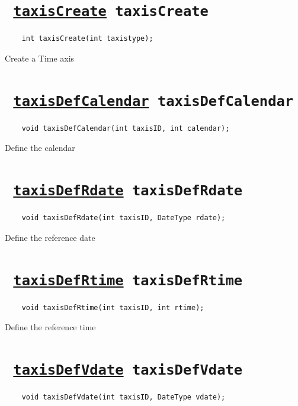 \section*{\texttt{ 
\ifpdf
\hyperref[taxisCreate]{taxisCreate}
\else
taxisCreate
\fi
}}
\begin{verbatim}
    int taxisCreate(int taxistype);
\end{verbatim}

Create a Time axis
\ifpdfoutput{}{(\ref{taxisCreate})}


\section*{\texttt{ 
\ifpdf
\hyperref[taxisDefCalendar]{taxisDefCalendar}
\else
taxisDefCalendar
\fi
}}
\begin{verbatim}
    void taxisDefCalendar(int taxisID, int calendar);
\end{verbatim}

Define the calendar
\ifpdfoutput{}{(\ref{taxisDefCalendar})}


\section*{\texttt{ 
\ifpdf
\hyperref[taxisDefRdate]{taxisDefRdate}
\else
taxisDefRdate
\fi
}}
\begin{verbatim}
    void taxisDefRdate(int taxisID, DateType rdate);
\end{verbatim}

Define the reference date
\ifpdfoutput{}{(\ref{taxisDefRdate})}


\section*{\texttt{ 
\ifpdf
\hyperref[taxisDefRtime]{taxisDefRtime}
\else
taxisDefRtime
\fi
}}
\begin{verbatim}
    void taxisDefRtime(int taxisID, int rtime);
\end{verbatim}

Define the reference time
\ifpdfoutput{}{(\ref{taxisDefRtime})}


\section*{\texttt{ 
\ifpdf
\hyperref[taxisDefVdate]{taxisDefVdate}
\else
taxisDefVdate
\fi
}}
\begin{verbatim}
    void taxisDefVdate(int taxisID, DateType vdate);
\end{verbatim}

